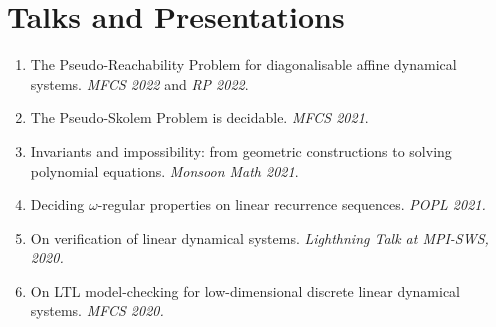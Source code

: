 \documentclass{article}
\begin{document}
	\section*{Talks and Presentations}
	\begin{enumerate}
		\item The Pseudo-Reachability Problem for diagonalisable affine dynamical systems. \emph{MFCS 2022} and \emph{RP 2022}.
		\item The Pseudo-Skolem Problem is decidable. \emph{MFCS 2021}.
		\item Invariants and impossibility: from geometric constructions to solving polynomial equations. \emph{Monsoon Math 2021}.
		\item Deciding $\omega$-regular properties on linear recurrence sequences. \emph{POPL 2021.}
		\item On verification of linear dynamical systems. \emph{Lighthning Talk at MPI-SWS, 2020.}
		\item  On LTL model-checking for low-dimensional discrete
		linear dynamical systems. \emph{MFCS 2020.}
	\end{enumerate}
\end{document}
